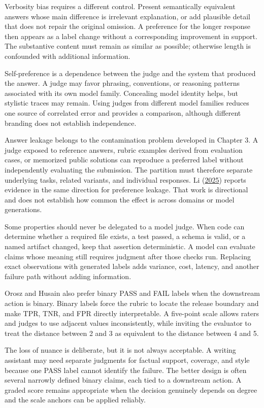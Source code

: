 Verbosity bias requires a different control. Present semantically equivalent answers whose main difference is irrelevant explanation, or add plausible detail that does not repair the original omission. A preference for the longer response then appears as a label change without a corresponding improvement in support. The substantive content must remain as similar as possible; otherwise length is confounded with additional information.

Self-preference is a dependence between the judge and the system that produced the answer. A judge may favor phrasing, conventions, or reasoning patterns associated with its own model family. Concealing model identity helps, but stylistic traces may remain. Using judges from different model families reduces one source of correlated error and provides a comparison, although different branding does not establish independence.

Answer leakage belongs to the contamination problem developed in Chapter 3. A judge exposed to reference answers, rubric examples derived from evaluation cases, or memorized public solutions can reproduce a preferred label without independently evaluating the submission. The partition must therefore separate underlying tasks, related variants, and individual responses. Li (\href{https://arxiv.org/abs/2502.01534}{2025}) reports evidence in the same direction for preference leakage. That work is directional and does not establish how common the effect is across domains or model generations.

Some properties should never be delegated to a model judge. When code can determine whether a required file exists, a test passed, a schema is valid, or a named artifact changed, keep that assertion deterministic. A model can evaluate claims whose meaning still requires judgment after those checks run. Replacing exact observations with generated labels adds variance, cost, latency, and another failure path without adding information.

Orosz and Husain also prefer binary PASS and FAIL labels when the downstream action is binary. Binary labels force the rubric to locate the release boundary and make TPR, TNR, and FPR directly interpretable. A five-point scale allows raters and judges to use adjacent values inconsistently, while inviting the evaluator to treat the distance between 2 and 3 as equivalent to the distance between 4 and 5.

The loss of nuance is deliberate, but it is not always acceptable. A writing assistant may need separate judgments for factual support, coverage, and style because one PASS label cannot identify the failure. The better design is often several narrowly defined binary claims, each tied to a downstream action. A graded score remains appropriate when the decision genuinely depends on degree and the scale anchors can be applied reliably.

